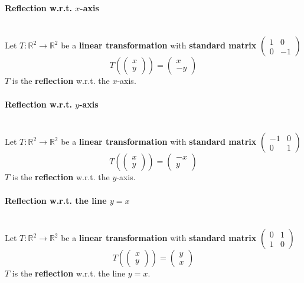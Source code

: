 \documentclass[../ma2001_notes.tex]{subfiles}
\begin{document}
\paragraph{Reflection w.r.t. $x$-axis}\,\\
Let \(T:\mathbb{R}^2\to\mathbb{R}^2\) be a \textbf{linear transformation} with \textbf{standard matrix} \(\begin{pmatrix}
	1 & 0 \\ 0 & -1
\end{pmatrix}\)
\[T\left(\begin{pmatrix}
	x \\ y
\end{pmatrix}\right)=\begin{pmatrix}
	x \\ -y
\end{pmatrix}\]
\(T\) is the \textbf{reflection} w.r.t. the \(x\)-axis.

\paragraph{Reflection w.r.t. $y$-axis}\,\\
Let \(T:\mathbb{R}^2\to\mathbb{R}^2\) be a \textbf{linear transformation} with \textbf{standard matrix} \(\begin{pmatrix}
	-1 & 0 \\ 0 & 1
\end{pmatrix}\)
\[T\left(\begin{pmatrix}
	x \\ y
\end{pmatrix}\right)=\begin{pmatrix}
	-x \\ y
\end{pmatrix}\]
\(T\) is the \textbf{reflection} w.r.t. the \(y\)-axis.

\paragraph{Reflection w.r.t. the line $y=x$}\,\\
Let \(T:\mathbb{R}^2\to\mathbb{R}^2\) be a \textbf{linear transformation} with \textbf{standard matrix} \(\begin{pmatrix}
	0 & 1 \\ 1 & 0
\end{pmatrix}\)
\[T\left(\begin{pmatrix}
	x \\ y
\end{pmatrix}\right)=\begin{pmatrix}
	y \\ x
\end{pmatrix}\]
\(T\) is the \textbf{reflection} w.r.t. the line \(y=x\).
\end{document}
